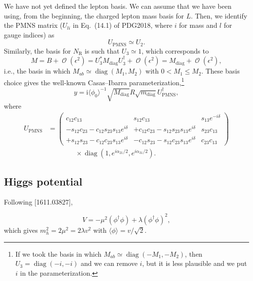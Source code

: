 \documentclass[a4paper,11pt]{scrartcl}
\numberwithin{equation}{section}
\newcommand\w[1]{_{\mathrm{#1}}}
\newcommand\ii{\mathrm{i}}
\newcommand\pmat[1]{\begin{pmatrix}#1\end{pmatrix}}
\DeclareMathOperator{\Order}{\mathcal{O}}
\newcommand\vev[1]{\langle#1\rangle}
\newcommand\NR{{N\w R}}
\DeclareMathOperator{\diag}{\mathrm{diag}}
\begin{document}
We have not yet defined the lepton basis.
We can assume that we have been using, from the beginning, the charged lepton mass basis for $L$.
Then, we identify the PMNS matrix ($U_{li}$ in Eq.~(14.1) of PDG2018, where $i$ for mass and $l$ for gauge indices) as
\begin{equation}
 U\w{PMNS} \simeq U_2.
\end{equation}
Similarly, the basis for $\NR$ is such that $U_3 \simeq 1$, which corresponds to
\begin{equation}
 M = B + \Order(\epsilon^2) = U_3^* M\w{diag} U_3^\dagger +\Order(\epsilon^2) = M\w{diag} + \Order(\epsilon^2),
\end{equation}
i.e., the basis in which $M_{ab}\simeq\diag(M_1, M_2)$ with $0<M_1\le M_2$.
These basis choice gives the well-known Casas--Ibarra parameterization,\footnote{
If we took the basis in which $M_{ab}\simeq\diag(-M_1, -M_2)$, then $U_3=\diag(-i, -i)$ and we can remove $i$, but it is less plausible and we put $i$ in the parameterization.
}
\begin{equation}
 y = \ii\vev{\phi_0}^{-1}\sqrt{M\w{diag}}R\sqrt{m\w{diag}}U\w{PMNS}^\dagger,
\end{equation}
where
\begin{equation}\begin{split}
 U\w{PMNS} &= \pmat{
                 c_{12}      c_{13}             &                 s_{12}      c_{13}            &       s_{13} e^{-i\delta} \\
 -s_{12}c_{23} - c_{12}s_{23}s_{13}e^{i\delta}  & +c_{12}c_{23} - s_{12}s_{23}s_{13}e^{i\delta} & s_{23}c_{13}\\
 +s_{12}s_{23} - c_{12}c_{23}s_{13}e^{i\delta}  & -c_{12}s_{23} - s_{12}c_{23}s_{13}e^{i\delta} & c_{23}c_{13}
}
\\&\qquad\qquad
\times\diag(1, e^{i\alpha_{21}/2}, e^{i\alpha_{31}/2}).
\end{split}\end{equation}

\subsection{Higgs potential}
Following [1611.03827],

\begin{equation}
 V = -\mu^2(\phi^\dagger \phi) + \lambda(\phi^\dagger \phi)^2,
\end{equation}
which gives $m_h^2 = 2\mu^2 = 2\lambda v^2$ with $\vev{\phi}=v/\sqrt{2}$.
\end{document}
